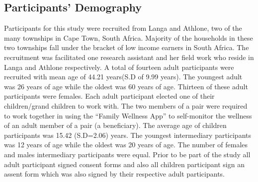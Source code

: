\documentclass{sig-alternate}
\begin{document}
\subsection{Participants' Demography}
Participants for this study were recruited from Langa and Athlone, two of the many townships in Cape Town, South Africa. Majority of the households in these two townships fall under the bracket of low income earners in South Africa. The recruitment was facilitated one research assistant and her field work who reside in Langa and Athlone respectively.\newline
A total of fourteen adult participants were recruited with mean age of 44.21 years(S.D of 9.99 years). The youngest adult was 26 years of age while the oldest was 60 years of age. Thirteen of these adult participants were females. Each adult participant elected one of their children/grand children to work with. The two members of a pair were required to work together in using the ``Family Wellness App'' to self-monitor the wellness of an adult member of a pair (a beneficiary). The average age of children participants was 15.42 (S.D=2.06) years. The youngest intermediary participants was 12 years of age while the oldest was 20 years of age. The number of females and males intermediary participants were equal. Prior to be part of the study all adult participant signed consent forms and also all children participant sign an assent form which was also signed by their respective adult participants.\newline  
\end{document}
